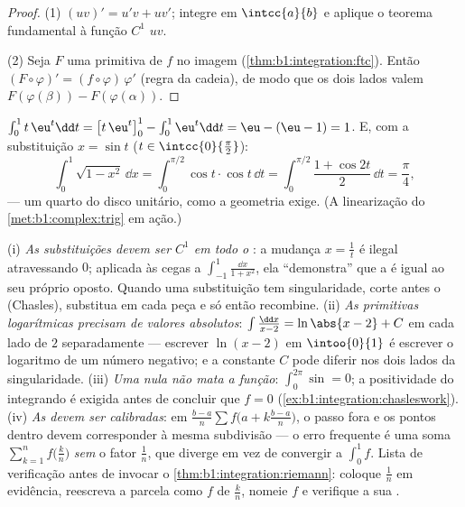\begin{proof}
(1) $(uv)' = u'v + uv'$; integre em $\intcc{a}{b}$ e aplique o
teorema fundamental à função $C^1$ $uv$.

(2) Seja $F$ uma primitiva de $f$ no  imagem
(\cref{thm:b1:integration:ftc}). Então $(F \circ \varphi)' = (f
\circ \varphi)\,\varphi'$ (regra da cadeia), de modo que os dois lados valem
$F(\varphi(\beta)) - F(\varphi(\alpha))$.
\end{proof}

\begin{example}\label{ex:b1:integration:parts}
$\int_0^1 t\,\eu^t \dd t = \bigl[t\,\eu^t\bigr]_0^1 - \int_0^1
\eu^t\dd t = \eu - (\eu - 1) = 1$. E, com a substituição $x =
\sin t$ ($t \in \intcc{0}{\frac\pi2}$):
\[
\int_0^1 \sqrt{1 - x^2}\, \dd x
= \int_0^{\pi/2} \cos t \cdot \cos t \, \dd t
= \int_0^{\pi/2} \frac{1 + \cos 2t}{2}\, \dd t = \frac\pi4 ,
\]
--- um quarto do disco unitário, como a geometria exige. (A linearização
do \cref{met:b1:complex:trig} em ação.)
\end{example}

\begin{remark}
(i) \emph{As substituições devem ser $C^1$ em todo o }:
a mudança $x = \frac1t$ é ilegal atravessando $0$; aplicada às cegas
a $\int_{-1}^{1}\frac{\dd x}{1 + x^2}$, ela ``demonstra'' que a
 é igual ao seu próprio oposto. Quando uma substituição tem
singularidade, corte antes o  (Chasles), substitua em
cada peça e só então recombine. (ii) \emph{As primitivas
logarítmicas precisam de valores absolutos}: $\int \frac{\dd x}{x - 2} =
\ln\abs{x - 2} + C$ em cada lado de $2$ separadamente --- escrever
$\ln(x - 2)$ em $\intoo{0}{1}$ é escrever o logaritmo de um
número negativo; e a constante $C$ pode diferir nos dois
lados da singularidade. (iii) \emph{Uma  nula não
mata a função}: $\int_0^{2\pi}\sin = 0$; a positividade do
integrando é exigida antes de concluir que $f = 0$
(\cref{ex:b1:integration:chasleswork}). (iv) \emph{As 
devem ser calibradas}: em $\frac{b-a}{n}\sum f\bigl(a +
k\frac{b-a}{n}\bigr)$, o passo fora e os pontos dentro
devem corresponder à mesma subdivisão --- o erro frequente é uma soma
$\sum_{k=1}^{n} f\bigl(\frac kn\bigr)$ \emph{sem} o fator
$\frac1n$, que diverge em vez de convergir a $\int_0^1
f$. Lista de verificação antes de invocar o \cref{thm:b1:integration:riemann}:
coloque $\frac1n$ em evidência, reescreva a parcela como $f$ de $\frac kn$,
nomeie $f$ e verifique a sua .
\end{remark}

